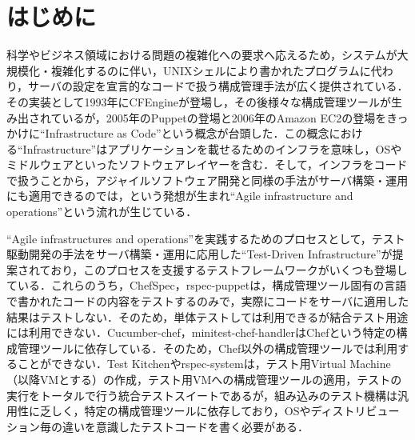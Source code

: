 \section{はじめに}

科学やビジネス領域における問題の複雑化への要求へ応えるため，システムが大規模化・複雑化する\cite{survey_and_taxonomy_of_iaas}のに伴い，UNIXシェルにより書かれたプログラムに代わり，サーバの設定を宣言的なコードで扱う構成管理手法が広く提供されている．その実装として1993年にCFEngine\cite{cfengine}が登場し，その後様々な構成管理ツールが生み出されているが\cite{cmt}，2005年のPuppetの登場\cite{puppet}と2006年のAmazon EC2の登場\cite{ec2}をきっかけに``Infrastructure as Code''という概念が台頭した．この概念における``Infrastructure''はアプリケーションを載せるためのインフラを意味し，OSやミドルウェアといったソフトウェアレイヤーを含む．そして，インフラをコードで扱うことから，アジャイルソフトウェア開発\cite{agile_manifesto}と同様の手法がサーバ構築・運用にも適用できるのでは，という発想が生まれ``Agile infrastructure and operations''\cite{agile_infrastructure}という流れが生じている．

``Agile infrastructures and operations''を実践するためのプロセスとして，テスト駆動開発\cite{test_driven_development}の手法をサーバ構築・運用に応用した``Test-Driven Infrastructure''\cite{test_driven_infrastructure_with_chef}が提案されており，このプロセスを支援するテストフレームワークがいくつも登場している\cite{chefspec}\cite{rspec-puppet}\cite{cucumber-chef}\cite{minitest-chef-handler}\cite{test-kitchen}\cite{rspec-system}．これらのうち，ChefSpec\cite{chefspec}，rspec-puppet\cite{rspec-puppet}は，構成管理ツール固有の言語で書かれたコードの内容をテストするのみで，実際にコードをサーバに適用した結果はテストしない．そのため，単体テストしては利用できるが結合テスト用途には利用できない．Cucumber-chef\cite{cucumber-chef}，minitest-chef-handler\cite{minitest-chef-handler}はChefという特定の構成管理ツールに依存している．そのため，Chef以外の構成管理ツールでは利用することができない．Test Kitchen\cite{test-kitchen}やrspec-system\cite{rspec-system}は，テスト用Virtual Machine（以降VMとする）の作成，テスト用VMへの構成管理ツールの適用，テストの実行をトータルで行う統合テストスイートであるが，組み込みのテスト機構は汎用性に乏しく，特定の構成管理ツールに依存しており，OSやディストリビューション毎の違いを意識したテストコードを書く必要がある．

